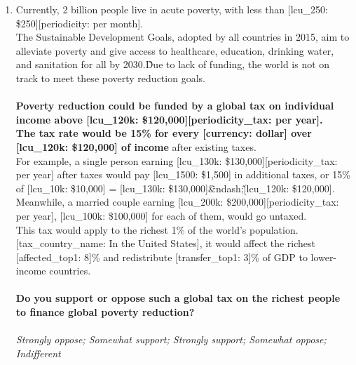 \begin{enumerate}[resume]
\item  \label{q:top1_tax_support} Currently, 2 billion people live in acute poverty, with less than [lcu\_250: \$250][periodicity: per month].\\The Sustainable Development Goals, adopted by all countries in 2015, aim to alleviate poverty and give access to healthcare, education, drinking water, and sanitation for all by 2030.\~Due to lack of funding, the world is not on track to meet these poverty reduction goals.\\\\\textbf{Poverty reduction could be funded by a global tax on individual income above [lcu\_120k: \$120,000][periodicity\_tax: per year].\~\\The tax rate would be 15\% for every [currency: dollar] over [lcu\_120k: \$120,000] of income} after existing taxes.\~\\For example, a single person earning [lcu\_130k: \$130,000][periodicity\_tax: per year] after taxes would pay [lcu\_1500: \$1,500] in additional taxes, or 15\% of [lcu\_10k: \$10,000] = [lcu\_130k: \$130,000]\~\&ndash;\~[lcu\_120k: \$120,000]. Meanwhile, a married couple earning [lcu\_200k: \$200,000][periodicity\_tax: per year], [lcu\_100k: \$100,000] for each of them, would go untaxed.\\This tax would apply to the richest 1\% of the world's population. [tax\_country\_name: In the United States], it would affect the richest [affected\_top1: 8]\% and redistribute [transfer\_top1: 3]\% of GDP to lower-income countries.\\\\\textbf{Do you support or oppose such a global tax on the richest people to finance global poverty reduction?}\\ [\textit{Figure \ref{fig:top1_tax_support}}; 
\verb|top1_tax_support|]
  \\ \textit{Strongly oppose; Somewhat support; Strongly support; Somewhat oppose; Indifferent}


\end{enumerate}
